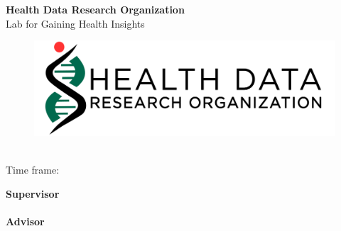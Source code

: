 \begin{titlepage}
\begin{center}
\LARGE{\textbf{Health Data Research Organization}}\\
\normalsize{Lab for Gaining Health Insights}\\[0.3cm]

\begin{figure}[h!]
    \centering
    \includegraphics[width=.3\linewidth]{images/logo.png}
\end{figure}
\vspace{1cm}
\Large{\textbf{\name}} \\[3pt]  
\vspace{0.5cm}
\large{Time frame: \timeFrame} \\ 

\vspace{1cm}

\large{\textbf{Supervisor}}\\
\supervisor\\
\vspace{0.5cm}
\textbf{Advisor}\\
\advisor\\
\end{center}
\end{titlepage}
